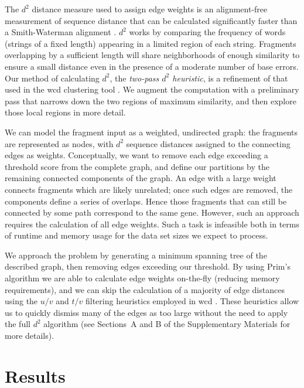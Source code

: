 \documentclass[a4,center,fleqn]{NAR}
\begin{document}
The $d^2$ distance measure used to assign edge weights is an
alignment-free measurement of sequence distance that can be calculated
significantly faster than a Smith-Waterman alignment
\cite{Hide94,Foret09}.  $d^2$ works by comparing the frequency of
words (strings of a fixed length) appearing in a limited region of
each string.  Fragments overlapping by a sufficient length will share
neighborhoods of enough similarity to ensure a small distance even in
the presence of a moderate number of base errors.  Our method of
calculating $d^2$, the {\it two-pass $d^2$ heuristic}, is a refinement
of that used in the {\sc wcd} clustering tool \cite{Hazelhurst08a}.  We
augment the computation with a preliminary pass that narrows down the
two regions of maximum similarity, and then explore those local
regions in more detail.

We can model the fragment input as a weighted, undirected graph: the fragments
are represented as nodes, with $d^2$ sequence distances assigned to
the connecting edges as weights.  Conceptually, we want to remove each
edge exceeding a threshold score from the complete graph, and define
our partitions by the remaining connected components of the graph.  An
edge with a large weight connects fragments which are likely unrelated;
once such edges are removed, the components define a series of
overlaps.  Hence those fragments that can still be connected by some path
correspond to the same gene.  However, such an approach requires the
calculation of all edge weights.  Such a task is infeasible both in terms of
runtime and memory usage for the data set sizes we expect to process.

We approach the problem by generating a minimum spanning tree of the
described graph, then removing edges exceeding our threshold.  By
using Prim's algorithm we are able to calculate edge weights
on-the-fly (reducing memory requirements), and we can skip the
calculation of a majority of edge distances using the $u/v$ and $t/v$
filtering heuristics employed in {\sc wcd} \cite{Hazelhurst08a}.
These heuristics allow us to quickly dismiss many of the edges as too
large without the need to apply the full $d^2$ algorithm (see
Sections~A and B of the Supplementary Materials for more details). 

\section{Results}
\end{document}
